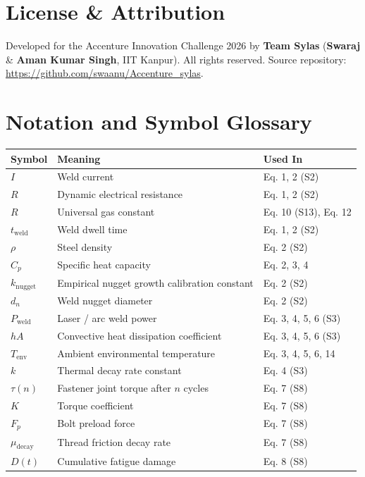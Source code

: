 \documentclass[11pt]{article}
\begin{document}
\section{License \& Attribution}

Developed for the Accenture Innovation Challenge 2026 by \textbf{Team Sylas} (\textbf{Swaraj} \& \textbf{Aman Kumar Singh}, IIT Kanpur). All rights reserved. Source repository: \url{https://github.com/swaanu/Accenture_sylas}.

\newpage
\appendix
\section{Notation and Symbol Glossary}

\begin{center}
\small
\begin{longtable}{p{2.6cm}p{6.6cm}p{2.5cm}}
\toprule
\textbf{Symbol} & \textbf{Meaning} & \textbf{Used In} \\
\midrule
\endhead
$I$ & Weld current & Eq. 1, 2 (S2) \\
$R$ & Dynamic electrical resistance & Eq. 1, 2 (S2) \\
$R$ & Universal gas constant & Eq. 10 (S13), Eq. 12 \\
$t_{\text{weld}}$ & Weld dwell time & Eq. 1, 2 (S2) \\
$\rho$ & Steel density & Eq. 2 (S2) \\
$C_p$ & Specific heat capacity & Eq. 2, 3, 4 \\
$k_{\text{nugget}}$ & Empirical nugget growth calibration constant & Eq. 2 (S2) \\
$d_n$ & Weld nugget diameter & Eq. 2 (S2) \\
$P_{\text{weld}}$ & Laser / arc weld power & Eq. 3, 4, 5, 6 (S3) \\
$hA$ & Convective heat dissipation coefficient & Eq. 3, 4, 5, 6 (S3) \\
$T_{\text{env}}$ & Ambient environmental temperature & Eq. 3, 4, 5, 6, 14 \\
$k$ & Thermal decay rate constant & Eq. 4 (S3) \\
$\tau(n)$ & Fastener joint torque after $n$ cycles & Eq. 7 (S8) \\
$K$ & Torque coefficient & Eq. 7 (S8) \\
$F_p$ & Bolt preload force & Eq. 7 (S8) \\
$\mu_{\text{decay}}$ & Thread friction decay rate & Eq. 7 (S8) \\
$D(t)$ & Cumulative fatigue damage & Eq. 8 (S8) \\

\end{longtable}
\end{center}
\end{document}
